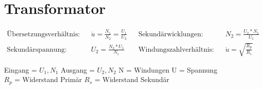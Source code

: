 \section*{Transformator}



\begin{tcolorbox}[colback=white,top=0pt]
    \begin{align*}
        \text{Übersetzungsverhältnis:} &  & \ddot{u} = \frac{N_1}{N_2} = \frac{U_1}{U_2} &  &
        \text{Sekundärwicklungen:}     &  & N_2 = \frac{U_2 * N_1}{U_1}            \\
        \text{Sekundärspannung:}       &  & U_2 = \frac{N_2 * U_1}{N_1}       &  &
        \text{Windungszahlverhältnis:} &  & \ddot{u} = \sqrt{\frac{R_p}{R_s}}
    \end{align*}
    \tcblower
    \begin{center}
        Eingang = \(U_1, N_1\) \hspace{1em} Ausgang = \(U_2, N_2\) \hspace{2em}  N = Windungen \hspace{1em}  U = Spannung\ \\
         \hspace{2em} \(R_p\) = Widerstand Primär \hspace{2em} \(R_s\) = Widerstand Sekundär
    \end{center}
\end{tcolorbox}